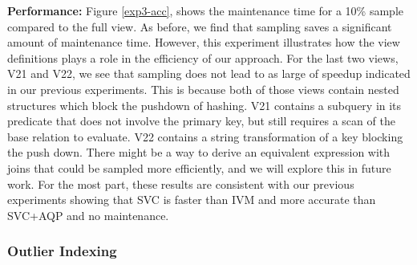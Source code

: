 \textbf{Performance: }
Figure \ref{exp3-acc}, shows the maintenance time for a 10\% sample compared to the full view.
As before, we find that sampling saves a significant amount of maintenance time.
However, this experiment illustrates how the view definitions plays a role in the efficiency of our approach.
For the last two views, V21 and V22, we see that sampling does not lead to as large of speedup indicated in our previous experiments.  
This is because both of those views contain nested structures which block the pushdown of hashing.
V21 contains a subquery in its predicate that does not involve the primary key, but still requires a scan of the base relation to evaluate.
V22 contains a string transformation of a key blocking the push down.
There might be a way to derive an equivalent expression with joins that could be sampled more efficiently, and we will explore this in future work.
For the most part, these results are consistent with our previous experiments showing that SVC is faster than IVM and more accurate than SVC+AQP and no maintenance.


\subsubsection{Outlier Indexing}

